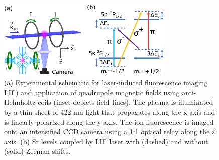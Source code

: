 \documentclass[11pt]{article}		%
\begin{document}
\begin{figure}[h]
	\label{fig:exp-schem}
	\centering
	\captionsetup{width=.8\linewidth} %
	\includegraphics[width=0.75\textwidth]{schematic-with-levels}
	\caption{(a) Experimental schematic for laser-induced fluorescence imaging LIF) and application of quadrupole magnetic fields using anti-Helmholtz coils (inset depicts field lines). The plasma is illuminated by a thin sheet of 422-nm light that propagates along the x axis and is linearly polarized along the y axis. The ion fluorescence is imaged onto an intensified CCD camera using a 1:1 optical relay along the z axis. (b) Sr levels coupled by LIF laser with (dashed) and without (solid) Zeeman shifts.}
	
\end{figure}

 
\end{document}

